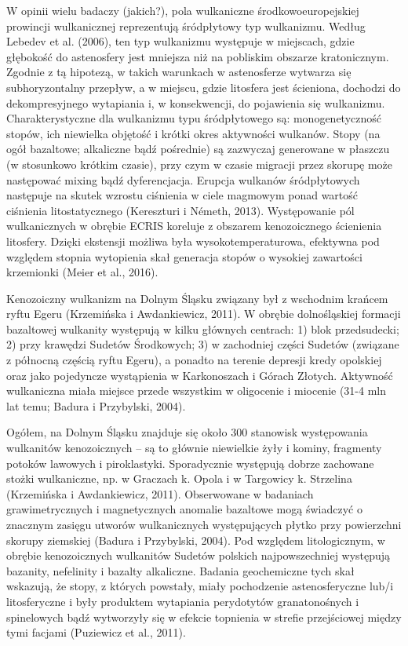 \documentclass[11.5pt,twoside]{report}
\begin{document}
W opinii wielu badaczy (jakich?), pola wulkaniczne środkowoeuropejskiej prowincji wulkanicznej reprezentują śródpłytowy typ wulkanizmu. Według Lebedev et al. (2006), ten typ wulkanizmu występuje w miejscach, gdzie głębokość do astenosfery jest mniejsza niż na pobliskim obszarze kratonicznym. Zgodnie z tą hipotezą, w takich warunkach w astenosferze wytwarza się subhoryzontalny przepływ, a w miejscu, gdzie litosfera jest ścieniona, dochodzi do dekompresyjnego wytapiania i, w konsekwencji, do pojawienia się wulkanizmu. Charakterystyczne dla wulkanizmu typu śródpłytowego są: monogenetyczność stopów, ich niewielka objętość i krótki okres aktywności wulkanów. Stopy (na ogół bazaltowe; alkaliczne bąd\'{z} pośrednie) są zazwyczaj generowane w płaszczu (w stosunkowo krótkim czasie), przy czym w czasie migracji przez skorupę może następować mixing bąd\'{z} dyferencjacja. Erupcja wulkanów śródpłytowych następuje na skutek wzrostu ciśnienia w ciele magmowym ponad wartość ciśnienia litostatycznego (Kereszturi i Németh, 2013). Występowanie pól wulkanicznych w obrębie ECRIS koreluje z obszarem kenozoicznego ścienienia litosfery. Dzięki ekstensji możliwa była wysokotemperaturowa, efektywna pod względem stopnia wytopienia skał generacja stopów o wysokiej zawartości krzemionki (Meier et al., 2016).

Kenozoiczny wulkanizm na Dolnym Śląsku związany był z wschodnim krańcem ryftu Egeru (Krzemińska i Awdankiewicz, 2011). W obrębie dolnośląskiej formacji bazaltowej wulkanity występują w kilku głównych centrach: 1) blok przedsudecki; 2) przy krawędzi Sudetów Środkowych; 3) w zachodniej części Sudetów (związane z północną częścią ryftu Egeru), a ponadto na terenie depresji kredy opolskiej oraz jako pojedyncze wystąpienia w Karkonoszach i Górach Złotych. Aktywność wulkaniczna miała miejsce przede wszystkim w oligocenie i miocenie (31-4 mln lat temu; Badura i Przybylski, 2004).

Ogółem, na Dolnym Śląsku znajduje się około 300 stanowisk występowania wulkanitów kenozoicznych -- są to głównie niewielkie żyły i kominy, fragmenty potoków lawowych i piroklastyki. Sporadycznie występują dobrze zachowane stożki wulkaniczne, np. w Graczach k. Opola i w Targowicy k. Strzelina (Krzemińska i Awdankiewicz, 2011). Obserwowane w badaniach grawimetrycznych i magnetycznych anomalie bazaltowe mogą świadczyć o znacznym zasięgu utworów wulkanicznych występujących płytko przy powierzchni skorupy ziemskiej (Badura i Przybylski, 2004). Pod względem litologicznym, w obrębie kenozoicznych wulkanitów Sudetów polskich najpowszechniej występują bazanity, nefelinity i bazalty alkaliczne. Badania geochemiczne tych skał wskazują, że stopy, z których powstały, miały pochodzenie astenosferyczne lub/i litosferyczne i były produktem wytapiania perydotytów granatonośnych i spinelowych bąd\'{z} wytworzyły się w efekcie topnienia w strefie przejściowej między tymi facjami (Puziewicz et al., 2011).
\end{document}
